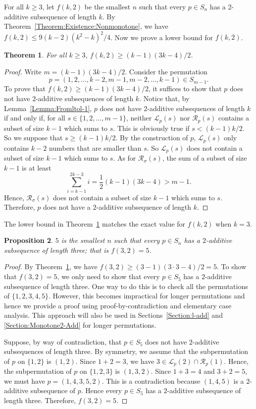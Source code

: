 \documentclass[11pt]{article}
\newtheorem{theorem}{Theorem}[section]
\newtheorem{proposition}[theorem]{Proposition}
\theoremstyle{definition}
\newcommand{\cl}{\mathcal{L}}
\newcommand{\crr}{\mathcal{R}}
\begin{document}
For all $k\geq3$, let $f(k,2)$ be the smallest $n$ such that every $p\in S_n$ has a 2-additive subsequence of length $k$. By Theorem~\ref{Theorem:Existence:Nonmonotone}, we have $f(k,2)\leq9(k-2)(k^2-k)^2/4$. Now we prove a lower bound for $f(k,2)$.

\begin{theorem}\label{Theorem:NonmonotoneLower}
For all $k\geq3$, $f(k,2)\geq(k-1)(3k-4)/2$.
\end{theorem}
\begin{proof}
Write $m=(k-1)(3k-4)/2$. Consider the permutation \[p=(1,2,\ldots,k-2,m-1,m-2,\ldots,k-1)\in S_{m-1}.\] 
To prove that $f(k,2)\geq(k-1)(3k-4)/2$, it suffices to show that $p$ does not have $2$-additive subsequences of length $k$. Notice that, by Lemma~\ref{Lemma:Fromltol-1}, $p$ does not have $2$-additive subsequences of length $k$ if and only if, for all $s\in\{1,2,\ldots,m-1\}$, neither $\cl_p(s)$ nor $\crr_p(s)$ contains a subset of size $k-1$ which sums to $s$. This is obviously true if $s<(k-1)k/2$. So we suppose that $s\geq(k-1)k/2$. By the construction of $p$, $\cl_p(s)$ only contains $k-2$ numbers that are smaller than $s$. So $\cl_p(s)$ does not contain a subset of size $k-1$ which sums to $s$. As for $\crr_\sigma(s)$, the sum of a subset of size $k-1$ is at least
\[
\sum_{i=k-1}^{2k-3}i=\frac{1}{2}(k-1)(3k-4)>m-1.%
\]
Hence, $\crr_\sigma(s)$ does not contain a subset of size $k-1$ which sums to $s$. Therefore, $p$ does not have a $2$-additive subsequence of length $k$.
\end{proof}
The lower bound in Theorem~\ref{Theorem:NonmonotoneLower} matches the exact value for $f(k,2)$ when $k=3$. 

\begin{proposition}\label{Prop:Extremal2Add}
$5$ is the smallest $n$ such that every $p\in S_n$ has a $2$-additive subsequence of length three; that is $f(3,2)=5$.
\end{proposition}
\begin{proof}
    By Theorem~\ref{Theorem:NonmonotoneLower}, we have $f(3,2)\geq(3-1)(3\cdot3-4)/2=5$. To show that $f(3,2)=5$, we only need to show that every $p\in S_5$ has a $2$-additive subsequence of length three. One way to do this is to check all the permutations of $\{1,2,3,4,5\}$. However, this becomes impractical for longer permutations and hence we provide a proof using proof-by-contradiction and elementary case analysis. This approach will also be used in Sections~\ref{Section:l-add} and \ref{Section:Monotone2-Add} for longer permutations.
    
    Suppose, by way of contradiction, that $p\in S_5$ does not have $2$-additive subsequences of length three. By symmetry, we assume that the subpermutation of $p$ on $\{1,2\}$ is $(1,2)$. Since $1+2=3$, we have $3\in\mathcal{L}_p(2)\cap\mathcal{R}_p(1)$. Hence, the subpermutation of $p$ on $\{1,2,3\}$ is $(1,3,2)$. Since $1+3=4$ and $3+2=5$, we must have $p=(1,4,3,5,2)$. This is a contradiction because $(1,4,5)$ is a $2$-additive subsequence of $p$. Hence every $p\in S_5$ has a $2$-additive subsequence of length three. Therefore, $f(3,2)=5$.
\end{proof}
\end{document}
